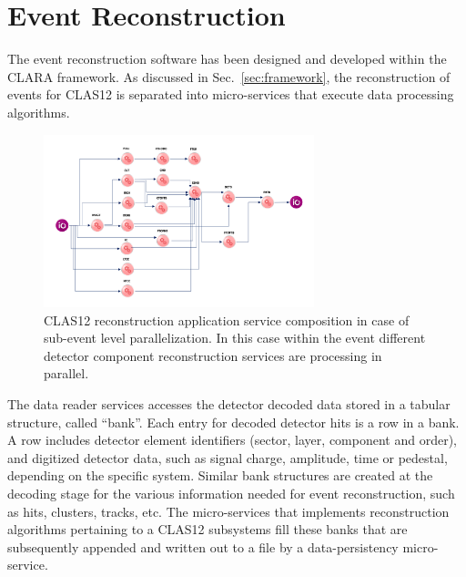 \section{Event Reconstruction}
The event reconstruction software has been designed and developed within the CLARA framework.
As discussed in Sec.~\ref{sec:framework}, the reconstruction of events for CLAS12 is separated into micro-services that execute data processing algorithms.

\begin{figure}
\centering
\includegraphics[width=0.7\textwidth]{pics/ServiceComposition.png}
\caption{CLAS12 reconstruction application service composition in case of sub-event level parallelization.
In this case within the event different detector component reconstruction services are processing in parallel.}
\label{fig:services}
\end{figure}


The data reader services accesses the detector decoded data stored in a tabular structure,
called ``bank''. Each entry for decoded
detector hits is a row in a bank. A row includes detector element identifiers (sector, layer, component and order), and digitized detector data, such as signal charge, amplitude, time or pedestal, depending on the specific system. Similar bank structures are created at the decoding stage for the various information needed for event reconstruction, such as hits, clusters, tracks, etc.
The micro-services that implements reconstruction algorithms pertaining to a CLAS12 subsystems fill these banks
that are subsequently appended and written out to a file by a data-persistency micro-service.

